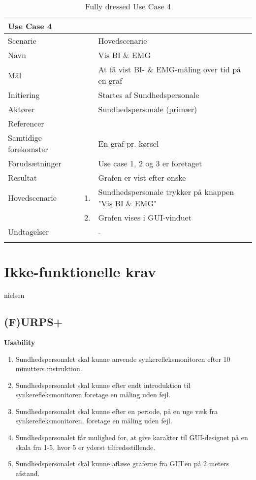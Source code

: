 \documentclass[main.tex]{subfiles}
\begin{document}
\begin{longtabu} to  %
	{\large \textbf{Use Case 4}} && \\
	\toprule
	Scenarie 				&&	Hovedscenarie\\
	Navn 					&& 	Vis BI \& EMG\\
	Mål 					&& 	At få vist BI- \& EMG-måling over tid på en graf\\
	Initiering 				&& 	Startes af Sundhedspersonale\\
	Aktører 				&& 	Sundhedspersonale (primær)\\
	Referencer 				&& 	\\
	Samtidige forekomster  	&& 	En graf pr. kørsel \\
	Forudsætninger 			&&	Use case 1, 2 og 3 er foretaget\\ 
	Resultat 				&& 	Grafen er vist efter ønske\\ \midrule
	Hovedscenarie 			&    1. 	&	Sundhedspersonale trykker på knappen "Vis BI \& EMG"\\				 	
							&    2. 	& 	Grafen vises i GUI-vinduet\\
	Undtagelser 			&			& 	-  \\ \bottomrule
	
	\caption{Fully dressed Use Case 4}
	\label{UC4}
\end{longtabu}


\section{Ikke-funktionelle krav}

nielsen \cite{NielsenUsabilityUsability}

\subsection{(F)URPS+}

\textbf{Usability}
\begin{enumerate}
\item Sundhedspersonalet skal kunne anvende synkerefleksmonitoren efter 10 minutters instruktion. 
\item Sundhedspersonalet skal kunne efter endt introduktion til synkerefleksmonitoren foretage en måling uden fejl.
\item Sundhedspersonalet skal kunne efter en periode, på en uge væk fra synkerefleksmonitoren, foretage en måling uden fejl.
\item Sundhedspersonalet får mulighed for, at give karakter til GUI-designet på en skala fra 1-5, hvor 5 er yderst tilfredsstillende.
\item Sundhedspersonalet skal kunne aflæse graferne fra GUI'en på 2 meters afstand. 
\end{enumerate}
                                                                                                
\end{document}
